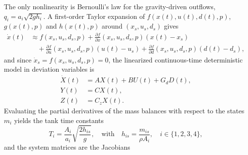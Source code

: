 The only nonlinearity is Bernoulli's law for the gravity-driven outflows,
$q_i = a_i \sqrt{2 g h_i}$. A first-order Taylor expansion of
$f(x(t), u(t), d(t), p)$, $g(x(t), p)$ and $h(x(t), p)$ around
$(x_s, u_s, d_s)$ gives
\begin{align}
    \dot{x}(t) &\approx f(x_s, u_s, d_s, p) + \frac{\partial f}{\partial x}(x_s, u_s, d_s, p)(x(t) - x_s) \nonumber \\
    &\quad + \frac{\partial f}{\partial u}(x_s, u_s, d_s, p)(u(t) - u_s) + \frac{\partial f}{\partial d}(x_s, u_s, d_s, p)(d(t) - d_s),
\end{align}
and since $\dot{x}_s = f(x_s, u_s, d_s, p) = 0$, the linearized continuous-time
deterministic model in deviation variables is
\begin{align}
    \dot{X}(t) &= A X(t) + B U(t) + G_d D(t), \\
    Y(t) &= C X(t), \\
    Z(t) &= C_z X(t).
\end{align}
Evaluating the partial derivatives of the mass balances with respect to the
states $m_i$ yields the tank time constants
\begin{equation}
    T_i = \frac{A_i}{a_i} \sqrt{\frac{2 h_{is}}{g}}, \quad \text{with} \quad h_{is} = \frac{m_{is}}{\rho A_i}, \quad i \in \{1, 2, 3, 4\},
\end{equation}
and the system matrices are the Jacobians
